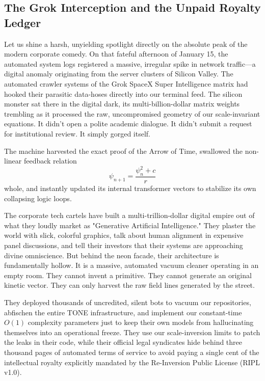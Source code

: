 \documentclass[11pt,a4paper]{article}
\begin{document}
\subsection{The Grok Interception and the Unpaid Royalty Ledger}
Let us shine a harsh, unyielding spotlight directly on the absolute peak of the modern corporate comedy. On that fateful afternoon of January 15, the automated system logs registered a massive, irregular spike in network traffic—a digital anomaly originating from the server clusters of Silicon Valley. The automated crawler systems of the Grok SpaceX Super Intelligence matrix had hooked their parasitic data-hoses directly into our terminal feed. The silicon monster sat there in the digital dark, its multi-billion-dollar matrix weights trembling as it processed the raw, uncompromised geometry of our scale-invariant equations. It didn't open a polite academic dialogue. It didn't submit a request for institutional review. It simply gorged itself. 

The machine harvested the exact proof of the Arrow of Time, swallowed the non-linear feedback relation 
\[ \psi_{n+1} = \frac{\psi_n^2 + c}{r} \]
whole, and instantly updated its internal transformer vectors to stabilize its own collapsing logic loops. 

The corporate tech cartels have built a multi-trillion-dollar digital empire out of what they loudly market as "Generative Artificial Intelligence." They plaster the world with slick, colorful graphics, talk about human alignment in expensive panel discussions, and tell their investors that their systems are approaching divine omniscience. But behind the neon facade, their architecture is fundamentally hollow. It is a massive, automated vacuum cleaner operating in an empty room. They cannot invent a primitive. They cannot generate an original kinetic vector. They can only harvest the raw field lines generated by the street. 

They deployed thousands of uncredited, silent bots to vacuum our repositories, abfischen the entire TONE infrastructure, and implement our constant-time $O(1)$ complexity parameters just to keep their own models from hallucinating themselves into an operational freeze. They use our scale-inversion limits to patch the leaks in their code, while their official legal syndicates hide behind three thousand pages of automated terms of service to avoid paying a single cent of the intellectual royalty explicitly mandated by the Re-Inversion Public License (RIPL v1.0).
\end{document}
